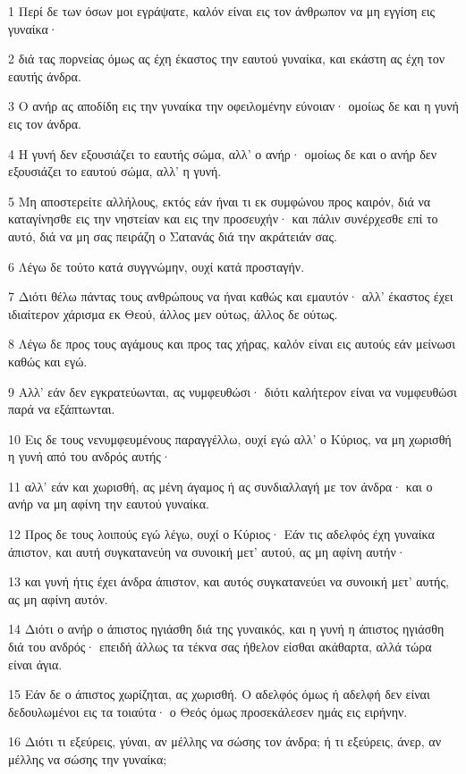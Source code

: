 \par 1 Περί δε των όσων μοι εγράψατε, καλόν είναι εις τον άνθρωπον να μη εγγίση εις γυναίκα·
\par 2 διά τας πορνείας όμως ας έχη έκαστος την εαυτού γυναίκα, και εκάστη ας έχη τον εαυτής άνδρα.
\par 3 Ο ανήρ ας αποδίδη εις την γυναίκα την οφειλομένην εύνοιαν· ομοίως δε και η γυνή εις τον άνδρα.
\par 4 Η γυνή δεν εξουσιάζει το εαυτής σώμα, αλλ' ο ανήρ· ομοίως δε και ο ανήρ δεν εξουσιάζει το εαυτού σώμα, αλλ' η γυνή.
\par 5 Μη αποστερείτε αλλήλους, εκτός εάν ήναι τι εκ συμφώνου προς καιρόν, διά να καταγίνησθε εις την νηστείαν και εις την προσευχήν· και πάλιν συνέρχεσθε επί το αυτό, διά να μη σας πειράζη ο Σατανάς διά την ακράτειάν σας.
\par 6 Λέγω δε τούτο κατά συγγνώμην, ουχί κατά προσταγήν.
\par 7 Διότι θέλω πάντας τους ανθρώπους να ήναι καθώς και εμαυτόν· αλλ' έκαστος έχει ιδιαίτερον χάρισμα εκ Θεού, άλλος μεν ούτως, άλλος δε ούτως.
\par 8 Λέγω δε προς τους αγάμους και προς τας χήρας, καλόν είναι εις αυτούς εάν μείνωσι καθώς και εγώ.
\par 9 Αλλ' εάν δεν εγκρατεύωνται, ας νυμφευθώσι· διότι καλήτερον είναι να νυμφευθώσι παρά να εξάπτωνται.
\par 10 Εις δε τους νενυμφευμένους παραγγέλλω, ουχί εγώ αλλ' ο Κύριος, να μη χωρισθή η γυνή από του ανδρός αυτής·
\par 11 αλλ' εάν και χωρισθή, ας μένη άγαμος ή ας συνδιαλλαγή με τον άνδρα· και ο ανήρ να μη αφίνη την εαυτού γυναίκα.
\par 12 Προς δε τους λοιπούς εγώ λέγω, ουχί ο Κύριος· Εάν τις αδελφός έχη γυναίκα άπιστον, και αυτή συγκατανεύη να συνοική μετ' αυτού, ας μη αφίνη αυτήν·
\par 13 και γυνή ήτις έχει άνδρα άπιστον, και αυτός συγκατανεύει να συνοική μετ' αυτής, ας μη αφίνη αυτόν.
\par 14 Διότι ο ανήρ ο άπιστος ηγιάσθη διά της γυναικός, και η γυνή η άπιστος ηγιάσθη διά του ανδρός· επειδή άλλως τα τέκνα σας ήθελον είσθαι ακάθαρτα, αλλά τώρα είναι άγια.
\par 15 Εάν δε ο άπιστος χωρίζηται, ας χωρισθή. Ο αδελφός όμως ή αδελφή δεν είναι δεδουλωμένοι εις τα τοιαύτα· ο Θεός όμως προσεκάλεσεν ημάς εις ειρήνην.
\par 16 Διότι τι εξεύρεις, γύναι, αν μέλλης να σώσης τον άνδρα; ή τι εξεύρεις, άνερ, αν μέλλης να σώσης την γυναίκα;
